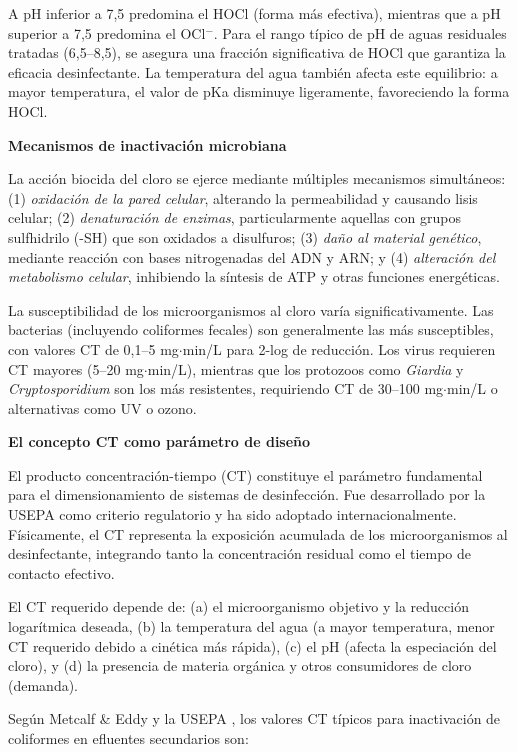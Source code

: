 \documentclass[12pt,a4paper]{article}
\begin{document}
A pH inferior a 7,5 predomina el HOCl (forma más efectiva), mientras que a pH superior a 7,5 predomina el OCl$^-$. Para el rango típico de pH de aguas residuales tratadas (6,5--8,5), se asegura una fracción significativa de HOCl que garantiza la eficacia desinfectante. La temperatura del agua también afecta este equilibrio: a mayor temperatura, el valor de pKa disminuye ligeramente, favoreciendo la forma HOCl.

\textbf{Mecanismos de inactivación microbiana}

La acción biocida del cloro se ejerce mediante múltiples mecanismos simultáneos: (1) \textit{oxidación de la pared celular}, alterando la permeabilidad y causando lisis celular; (2) \textit{denaturación de enzimas}, particularmente aquellas con grupos sulfhidrilo (-SH) que son oxidados a disulfuros; (3) \textit{daño al material genético}, mediante reacción con bases nitrogenadas del ADN y ARN; y (4) \textit{alteración del metabolismo celular}, inhibiendo la síntesis de ATP y otras funciones energéticas.

La susceptibilidad de los microorganismos al cloro varía significativamente. Las bacterias (incluyendo coliformes fecales) son generalmente las más susceptibles, con valores CT de 0,1--5 mg$\cdot$min/L para 2-log de reducción. Los virus requieren CT mayores (5--20 mg$\cdot$min/L), mientras que los protozoos como \textit{Giardia} y \textit{Cryptosporidium} son los más resistentes, requiriendo CT de 30--100 mg$\cdot$min/L o alternativas como UV o ozono.

\textbf{El concepto CT como parámetro de diseño}

El producto concentración-tiempo (CT) constituye el parámetro fundamental para el dimensionamiento de sistemas de desinfección. Fue desarrollado por la USEPA como criterio regulatorio y ha sido adoptado internacionalmente. Físicamente, el CT representa la exposición acumulada de los microorganismos al desinfectante, integrando tanto la concentración residual como el tiempo de contacto efectivo.

El CT requerido depende de: (a) el microorganismo objetivo y la reducción logarítmica deseada, (b) la temperatura del agua (a mayor temperatura, menor CT requerido debido a cinética más rápida), (c) el pH (afecta la especiación del cloro), y (d) la presencia de materia orgánica y otros consumidores de cloro (demanda).

Según Metcalf \& Eddy \cite{metcalf2014} y la USEPA \cite{usepa2003}, los valores CT típicos para inactivación de coliformes en efluentes secundarios son:
\end{document}
